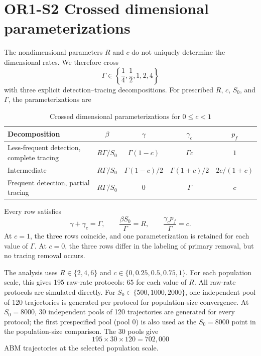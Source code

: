 \documentclass[11pt]{article}
\begin{document}
\section*{OR1-S2 Crossed dimensional parameterizations}
The nondimensional parameters $R$ and $c$ do not uniquely determine the dimensional rates. We therefore cross
\[
\Gamma\in\left\{\frac14,\frac12,1,2,4\right\}
\]
with three explicit detection--tracing decompositions. For prescribed $R$, $c$, $S_0$, and $\Gamma$, the parameterizations are
\begin{table}[H]
\caption{Crossed dimensional parameterizations for $0\leq c<1$}
\centering\small
\begin{tabularx}{\textwidth}{@{}p{}cccc@{}}
\toprule
Decomposition & $\beta$ & $\gamma$ & $\gamma_c$ & $p_f$ \\
\midrule
Less-frequent detection, complete tracing & $R\Gamma/S_0$ & $\Gamma(1-c)$ & $\Gamma c$ & $1$ \\
Intermediate & $R\Gamma/S_0$ & $\Gamma(1-c)/2$ & $\Gamma(1+c)/2$ & $2c/(1+c)$ \\
Frequent detection, partial tracing & $R\Gamma/S_0$ & $0$ & $\Gamma$ & $c$ \\
\bottomrule
\end{tabularx}
\end{table}
Every row satisfies
\[
\gamma+\gamma_c=\Gamma,\qquad
\frac{\beta S_0}{\Gamma}=R,\qquad
\frac{\gamma_c p_f}{\Gamma}=c.
\]
At $c=1$, the three rows coincide, and one parameterization is retained for each value of $\Gamma$. At $c=0$, the three rows differ in the labeling of primary removal, but no tracing removal occurs.

The analysis uses $R\in\{2,4,6\}$ and $c\in\{0,0.25,0.5,0.75,1\}$. For each population scale, this gives 195 raw-rate protocols: 65 for each value of $R$. All raw-rate protocols are simulated directly. For $S_0\in\{500,1000,2000\}$, one independent pool of 120 trajectories is generated per protocol for population-size convergence. At $S_0=8000$, 30 independent pools of 120 trajectories are generated for every protocol; the first prespecified pool (pool 0) is also used as the $S_0=8000$ point in the population-size comparison. The 30 pools give
\[
195\times30\times120=702{,}000
\]
ABM trajectories at the selected population scale.
\end{document}
